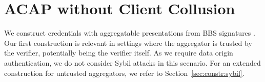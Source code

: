 \section{ACAP without Client Collusion} \label{sec:constr:acap}
We construct credentials with aggregatable presentations from BBS signatures \cite{DBLP:conf/eurocrypt/TessaroZ23a}. Our first construction is relevant in settings where the aggregator is trusted by the verifier, potentially being the verifier itself. As we require data origin authentication, we do not consider Sybil attacks in this scenario. For an extended construction for untrusted aggregators, we refer to Section~\ref{sec:constr:sybil}.


